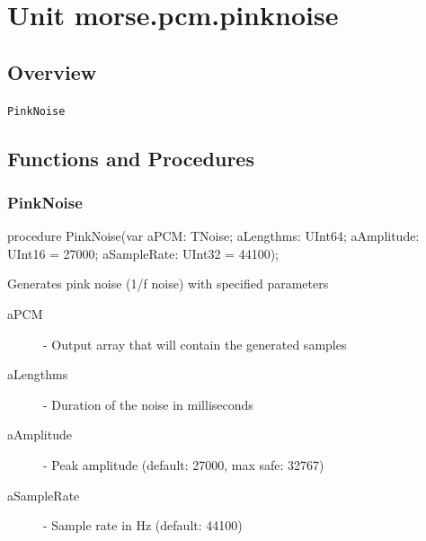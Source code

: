 \documentclass{report}
\newif\ifpdf
\begin{document}
\chapter{Unit morse.pcm.pinknoise}
\label{morse.pcm.pinknoise}
\section{Overview}
\begin{description}
\item[\texttt{PinkNoise}]
\end{description}
\section{Functions and Procedures}
\ifpdf
\subsection*{\large{\textbf{PinkNoise}}\normalsize\hspace{1ex}\hrulefill}
\else
\subsection*{PinkNoise}
\fi
\label{morse.pcm.pinknoise-PinkNoise}
\begin{list}{}{
\setlength{\itemindent}{0cm}
\setlength{\listparindent}{0cm}
\setlength{\leftmargin}{\evensidemargin}
\addtolength{\leftmargin}{\tmplength}
\settowidth{\labelsep}{X}
\addtolength{\leftmargin}{\labelsep}
\setlength{\labelwidth}{\tmplength}
}
\item[\textbf{Declaration}\hfill]
\ifpdf
\begin{flushleft}
\fi
\begin{ttfamily}
procedure PinkNoise(var aPCM: TNoise; aLengthms: UInt64; aAmplitude: UInt16 = 27000; aSampleRate: UInt32 = 44100);\end{ttfamily}

\ifpdf
\end{flushleft}
\fi

\par
\item[\textbf{Description}]
Generates pink noise (1/f noise) with specified parameters    \par
\item[\textbf{Parameters}]
\begin{description}
\item[aPCM] {-} Output array that will contain the generated samples
\item[aLengthms] {-} Duration of the noise in milliseconds
\item[aAmplitude] {-} Peak amplitude (default: 27000, max safe: 32767)
\item[aSampleRate] {-} Sample rate in Hz (default: 44100)
\end{description}


\end{list}
\end{document}
